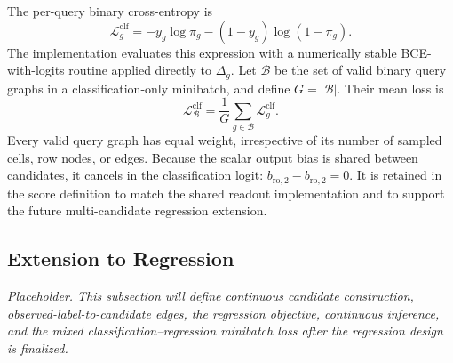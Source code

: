 The per-query binary cross-entropy is
\begin{equation}
  \mathcal L_g^{\mathrm{clf}}
  =
  -y_g\log\pi_g
  -(1-y_g)\log(1-\pi_g).
\label{eq:method:classification-loss}
\end{equation}
The implementation evaluates this expression with a numerically stable
BCE-with-logits routine applied directly to \(\Delta_g\). Let \(\mathcal B\)
be the set of valid binary query graphs in a classification-only minibatch,
and define \(G=|\mathcal B|\). Their mean loss is
\begin{equation}
  \mathcal L_{\mathcal B}^{\mathrm{clf}}
  =
  \frac{1}{G}
  \sum_{g\in\mathcal B}\mathcal L_g^{\mathrm{clf}}.
\label{eq:method:classification-batch-loss}
\end{equation}
Every valid query graph has equal weight, irrespective of its number of
sampled cells, row nodes, or edges. Because the scalar output bias is shared
between candidates, it cancels in the classification logit:
\(b_{\mathrm{ro},2}-b_{\mathrm{ro},2}=0\). It is retained in the score
definition to match the shared readout implementation and to support the
future multi-candidate regression extension.

\subsection{Extension to Regression}
\label{sec:method:regression-placeholder}

\emph{Placeholder. This subsection will define continuous candidate
construction, observed-label-to-candidate edges, the regression objective,
continuous inference, and the mixed classification--regression minibatch
loss after the regression design is finalized.}
